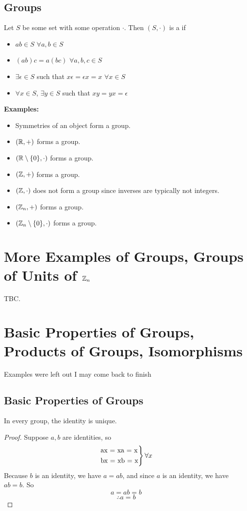 \documentclass[openany]{report}
\begin{document}
\section{Groups}
Let $S$ be some set with some operation $\cdot$. Then $(S, \cdot)$ is a  if
\begin{itemize}
    \item \textbf{} $ab \in S$ $\forall a,b \in S$
    \item \textbf{} $(ab)c = a(bc)$  $\forall a,b,c \in S$
    \item \textbf{} $\exists \epsilon \in S$ such that $x\epsilon = \epsilon x = x$  $\forall x \in S$
    \item \textbf{} $\forall x \in S$, $\exists y \in S$ such that $xy = yx = \epsilon$
\end{itemize}
\textbf{Examples:}
\begin{itemize}
    \item Symmetries of an object form a group.
    \item $(\mathbb{R}, +)$ forms a group.
    \item $(\mathbb{R} \setminus \{0\}, \cdot)$ forms a group.
    \item $(\mathbb{Z}, +)$ forms a group.
    \item $(\mathbb{Z}, \cdot)$ does not form a group since inverses are typically not integers.
    \item $(\mathbb{Z}_n, +)$ forms a group.
    \item $(\mathbb{Z}_n \setminus \{0\}, \cdot)$ forms a group.
\end{itemize}

\chapter{More Examples of Groups, Groups of Units of $\mathbb{Z}_n$}
TBC.

\chapter{Basic Properties of Groups, Products of Groups, Isomorphisms}
Examples were left out I may come back to finish
\section{Basic Properties of Groups}
\begin{prop}
    In every group, the identity is unique.
\end{prop}
\begin{proof}
    Suppose $a,b$ are identities, so\\
    \[\begin{rcases}
        $ax = xa = x$\\
        $bx = xb = x$
    \end{rcases}\forall x
    \]
    Because $b$ is an identity, we have $a = ab$, and since $a$ is an identity, we have $ab = b$. So
    $$a = ab = b$$
    $$\therefore a = b$$
\end{proof}
\end{document}
